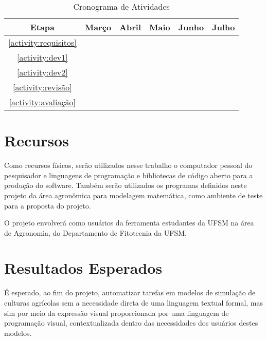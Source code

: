 \documentclass[12pt]{article}
\begin{document}
	\begin{table}[ht]
		\centering
		\begin{tabular}{c|ccccc}
			Etapa & Março & Abril & Maio & Junho & Julho \\ \hline
			\ref{activity:requisitos} & \checkmark & & & & \\
			\ref{activity:dev1} & \checkmark & \checkmark & \checkmark & & \\
			\ref{activity:dev2} & & \checkmark & \checkmark & \checkmark & \\
			\ref{activity:revisão} & \checkmark & \checkmark & \checkmark & \checkmark & \checkmark \\
			\ref{activity:avaliação} & & & & \checkmark & \checkmark \\
		\end{tabular}
		\caption{Cronograma de Atividades}
	\end{table}


	\section{Recursos}

	Como recursos físicos, serão utilizados nesse trabalho o computador pessoal do pesquisador e linguagens de programação e bibliotecas de código aberto para a produção do software. Também serão utilizados os programas definidos neste projeto da área agronômica para modelagem matemática, como ambiente de teste para a proposta do projeto.

	O projeto envolverá como usuários da ferramenta estudantes da UFSM na área de Agronomia, do Departamento de Fitotecnia da UFSM.

	\section{Resultados Esperados}

	É esperado, ao fim do projeto, automatizar tarefas em modelos de simulação de culturas agrícolas sem a necessidade direta de uma linguagem textual formal, mas sim por meio da expressão visual proporcionada por uma linguagem de programação visual, contextualizada dentro das necessidades dos usuários destes modelos.

	
	
\end{document}
